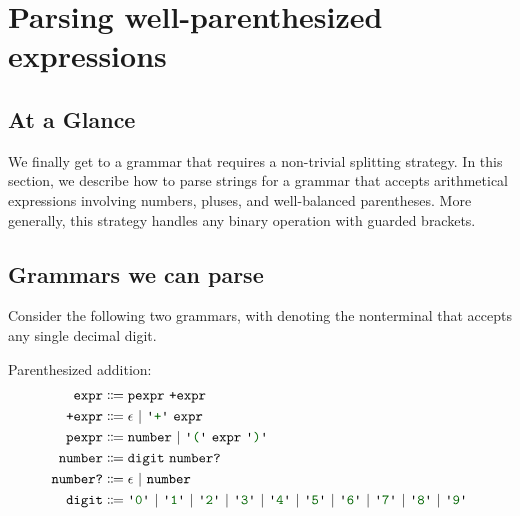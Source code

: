 \newcommand{\nullentry}{\texttt{\ensuremath{\emptyset}}}

\chapter{Parsing well-parenthesized expressions}
%  
\section{At a Glance}
  We finally get to a grammar that requires a non-trivial splitting strategy.  In this section, we describe how to parse strings for a grammar that accepts arithmetical expressions involving numbers, pluses, and well-balanced parentheses.  More generally, this strategy handles any binary operation with guarded brackets.
  
\section{Grammars we can parse}
  Consider the following two grammars, with  denoting the nonterminal that accepts any single decimal digit.
  
  Parenthesized addition:
  \begin{align*}
    \nt{expr} & \Coloneqq \nt{pexpr}~\nt{+expr} \\
    \nt{+expr} & \Coloneqq \epsilon~|~\terminal{+}~\nt{expr} \\
    \nt{pexpr} & \Coloneqq \nt{number}~|~\terminal{(}~\nt{expr}~\terminal{)} \\
    \nt{number} & \Coloneqq \nt{digit}~\nt{number?} \\
    \nt{number?} & \Coloneqq \epsilon~|~\nt{number} \\
    \nt{digit} & \Coloneqq \terminal{0}~|~\terminal{1}~|~\terminal{2}~|~\terminal{3}~|~\terminal{4}~|~\terminal{5}~|~\terminal{6}~|~\terminal{7}~|~\terminal{8}~|~\terminal{9}
  \end{align*}
  
